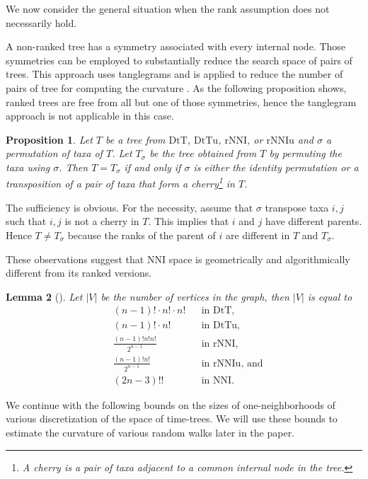 \documentclass{amsart}
\newtheorem{lemma}{Lemma}
\newtheorem{proposition}[lemma]{Proposition}
\theoremstyle{definition}
\newcommand{\nni}{\mathrm{NNI}}
\newcommand{\rnni}{\mathrm{rNNI}}
\newcommand{\rnniu}{\mathrm{rNNIu}}
\newcommand{\mdts}{\mathrm{DtT}}
\newcommand{\mdtsu}{\mathrm{DtTu}}
\begin{document}
We now consider the general situation when the rank assumption does not necessarily hold.
\endproof

A non-ranked tree has a symmetry associated with every internal node.
Those symmetries can be employed to substantially reduce the search space of pairs of trees.
This approach uses tanglegrams \autocite{Matsen2015-fn} and is applied to reduce the number of pairs of tree for computing the curvature \autocite{Whidden2015-es}.
As the following proposition shows, ranked trees are free from all but one of those symmetries, hence the tanglegram approach is not applicable in this case.

\begin{proposition}
Let $T$ be a tree from $\mdts$, $\mdtsu$, $\rnni$, or $\rnniu$ and $\sigma$ a permutation of taxa of $T$.
Let $T_\sigma$ be the tree obtained from $T$ by permuting the taxa using $\sigma$.
Then $T = T_\sigma$ if and only if $\sigma$ is either the identity permutation or a transposition of a pair of taxa that form a
cherry\footnote{A {\em cherry} is a pair of taxa adjacent to a common internal node in the tree.}
in $T$.
\end{proposition}

\proof
The sufficiency is obvious.
For the necessity, assume that $\sigma$ transpose taxa $i,j$ such that $i,j$ is not a cherry in $T$.
This implies that $i$ and $j$ have different parents.
Hence $T \ne T_\sigma$ because the ranks of the parent of $i$ are different in $T$ and $T_\sigma$.
\endproof

These observations suggest that $\nni$ space is geometrically and algorithmically different from its ranked versions.

\begin{lemma}[\textcite{Semple2003-nj}]\label{spaceSizes}
Let $|V|$ be the number of vertices in the graph, then $|V|$ is equal to
\begin{align*}
& (n-1)! \cdot n! \cdot n!	&& \mbox{in $\mdts$,}\\
& (n-1)! \cdot n!		&& \mbox{in $\mdtsu$,}\\
& \frac{(n-1)!n!n!}{2^{n-1}}	&& \mbox{in $\rnni$,}\\
& \frac{(n-1)!n!}{2^{n-1}}	&& \mbox{in $\rnniu$, and}\\
& (2n - 3)!!			&& \mbox{in $\nni$.}
\end{align*}
\end{lemma}

We continue with the following bounds on the sizes of one-neighborhoods of various discretization of the space of time-trees.
We will use these bounds to estimate the curvature of various random walks later in the paper.
\end{document}
